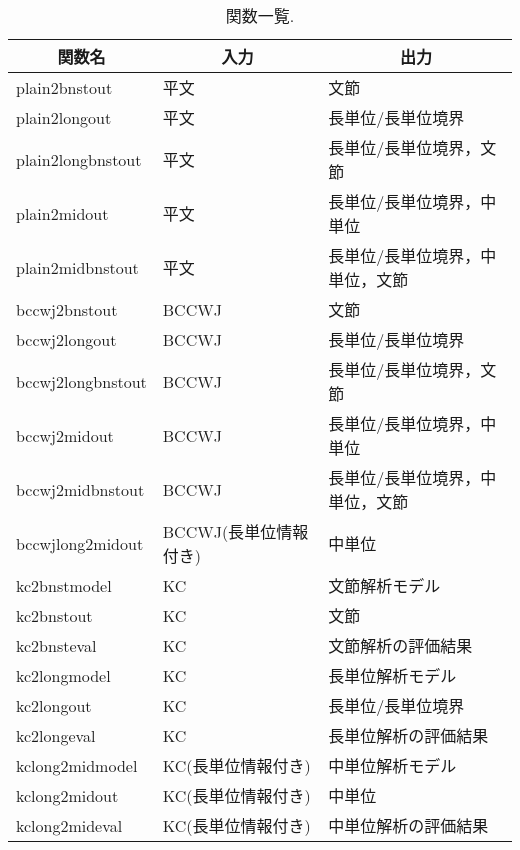 \documentclass[titlepage]{jarticle}
\begin{document}
\begin{table}[!ht]
\footnotesize
\begin{center}
\caption{関数一覧.}
\begin{tabular}{|l|l|l|}
\hline
\multicolumn{1}{|c|}{関数名} & \multicolumn{1}{c}{入力} & \multicolumn{1}{|c|}{出力} \\ \hline
plain2bnstout & 平文 & 文節 \\ \hline
plain2longout & 平文 & 長単位/長単位境界 \\ \hline
plain2longbnstout & 平文 & 長単位/長単位境界，文節 \\ \hline
plain2midout & 平文 & 長単位/長単位境界，中単位 \\ \hline
plain2midbnstout & 平文 & 長単位/長単位境界，中単位，文節 \\ \hline
bccwj2bnstout & BCCWJ & 文節 \\ \hline
bccwj2longout & BCCWJ & 長単位/長単位境界 \\ \hline
bccwj2longbnstout & BCCWJ & 長単位/長単位境界，文節 \\ \hline
bccwj2midout & BCCWJ & 長単位/長単位境界，中単位 \\ \hline
bccwj2midbnstout & BCCWJ & 長単位/長単位境界，中単位，文節 \\ \hline
bccwjlong2midout & BCCWJ(長単位情報付き) & 中単位 \\ \hline
kc2bnstmodel & KC & 文節解析モデル \\ \hline
kc2bnstout & KC & 文節 \\ \hline
kc2bnsteval & KC & 文節解析の評価結果 \\ \hline
kc2longmodel & KC & 長単位解析モデル \\ \hline
kc2longout & KC & 長単位/長単位境界 \\ \hline
kc2longeval & KC & 長単位解析の評価結果 \\ \hline
kclong2midmodel & KC(長単位情報付き) & 中単位解析モデル \\ \hline
kclong2midout & KC(長単位情報付き) & 中単位 \\ \hline
kclong2mideval & KC(長単位情報付き) & 中単位解析の評価結果 \\ \hline
\end{tabular}
\label{func_list}


\end{center}
\end{table}
\end{document}
